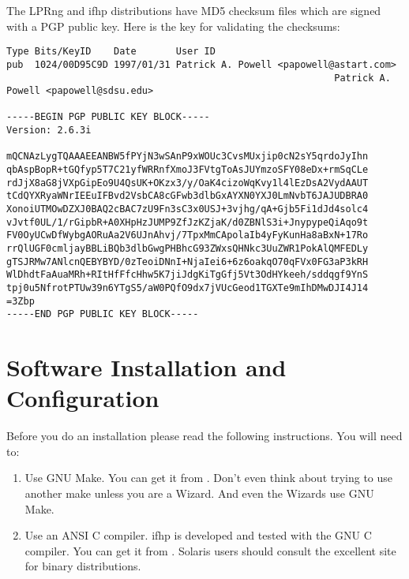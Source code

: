 \documentclass[a4paper]{article}
\begin{document}
The LPRng and {\ttfamily ifhp} distributions have MD5 checksum files
which are signed with a PGP public key.
Here is the key for validating the checksums:
\begin{tscreen}
\begin{verbatim}
Type Bits/KeyID    Date       User ID
pub  1024/00D95C9D 1997/01/31 Patrick A. Powell <papowell@astart.com>
                                                          Patrick A. Powell <papowell@sdsu.edu>

-----BEGIN PGP PUBLIC KEY BLOCK-----
Version: 2.6.3i

mQCNAzLygTQAAAEEANBW5fPYjN3wSAnP9xWOUc3CvsMUxjip0cN2sY5qrdoJyIhn
qbAspBopR+tGQfyp5T7C21yfWRRnfXmoJ3FVtgToAsJUYmzoSFY08eDx+rmSqCLe
rdJjX8aG8jVXpGipEo9U4QsUK+OKzx3/y/OaK4cizoWqKvy1l4lEzDsA2VydAAUT
tCdQYXRyaWNrIEEuIFBvd2VsbCA8cGFwb3dlbGxAYXN0YXJ0LmNvbT6JAJUDBRA0
XonoiUTMOwDZXJ0BAQ2cBAC7zU9Fn3sC3x0USJ+3vjhg/qA+Gjb5Fi1dJd4solc4
vJvtf0UL/1/rGipbR+A0XHpHzJUMP9ZfJzKZjaK/d0ZBNlS3i+JnypypeQiAqo9t
FV0OyUCwDfWybgAORuAa2V6UJnAhvj/7TpxMmCApolaIb4yFyKunHa8aBxN+17Ro
rrQlUGF0cmljayBBLiBQb3dlbGwgPHBhcG93ZWxsQHNkc3UuZWR1PokAlQMFEDLy
gTSJRMw7ANlcnQEBYBYD/0zTeoiDNnI+NjaIei6+6z6oakqO70qFVx0FG3aP3kRH
WlDhdtFaAuaMRh+RItHfFfcHhw5K7jiJdgKiTgGfj5Vt3OdHYkeeh/sddqgf9YnS
tpj0u5NfrotPTUw39n6YTgS5/aW0PQfO9dx7jVUcGeod1TGXTe9mIhDMwDJI4J14
=3Zbp
-----END PGP PUBLIC KEY BLOCK-----
\end{verbatim}
\end{tscreen}



\section{Software Installation and Configuration}

Before you do an installation
please read the following instructions.
You will need to:
\begin{enumerate}
\item Use GNU Make.  You can get it from
.
Don't even think about trying to use another
make unless you are a Wizard.  And even the Wizards use GNU Make.
\item Use an ANSI C compiler.
{\ttfamily ifhp} is developed and tested with the GNU C compiler.
You can get it from
.
Solaris users should consult the excellent 
site for binary distributions.
\end{enumerate}
\end{document}
